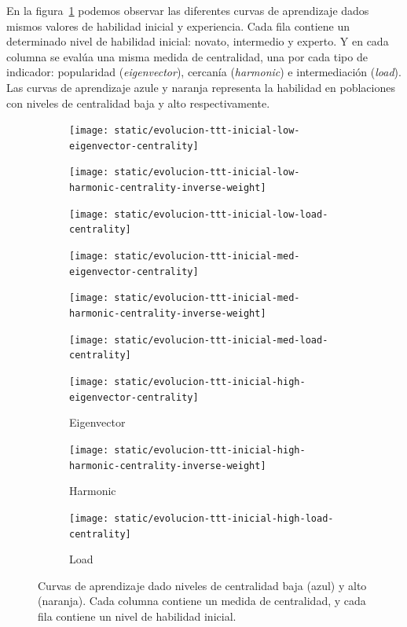 \documentclass[a4paper,11pt]{book}
\theoremstyle{definition}
\begin{document}
En la figura~\ref{fig:curvas_de_aprendizaje} podemos observar las diferentes curvas de aprendizaje dados mismos valores de habilidad inicial y experiencia.
%
Cada fila contiene un determinado nivel de habilidad inicial: novato, intermedio y experto.
%
Y en cada columna se eval\'ua una misma medida de centralidad, una por cada tipo de indicador: popularidad (\emph{eigenvector}), cercan\'ia (\emph{harmonic}) e intermediaci\'on (\emph{load}).
%
Las curvas de aprendizaje azule y naranja representa la habilidad en poblaciones con niveles de centralidad baja y alto respectivamente.
%
\begin{figure}[ht!]
    \centering
	\begin{subfigure}[t]{0.32\textwidth}\centering
	\texttt{[image: static/evolucion-ttt-inicial-low-eigenvector-centrality]}
	\end{subfigure}
	\begin{subfigure}[t]{0.32\textwidth}\centering
	\texttt{[image: static/evolucion-ttt-inicial-low-harmonic-centrality-inverse-weight]}
	\end{subfigure}
	\begin{subfigure}[t]{0.32\textwidth}\centering
	\texttt{[image: static/evolucion-ttt-inicial-low-load-centrality]}
	\end{subfigure}
	\begin{subfigure}[t]{0.32\textwidth}\centering
	\texttt{[image: static/evolucion-ttt-inicial-med-eigenvector-centrality]}
	\end{subfigure}
	\begin{subfigure}[t]{0.32\textwidth}\centering
	\texttt{[image: static/evolucion-ttt-inicial-med-harmonic-centrality-inverse-weight]}
	\end{subfigure}
	\begin{subfigure}[t]{0.32\textwidth}\centering
	\texttt{[image: static/evolucion-ttt-inicial-med-load-centrality]}
	\end{subfigure}
    \begin{subfigure}[t]{0.32\textwidth}\centering
	\texttt{[image: static/evolucion-ttt-inicial-high-eigenvector-centrality]}
	\caption{Eigenvector}
	\end{subfigure}
	\begin{subfigure}[t]{0.32\textwidth}\centering
	\texttt{[image: static/evolucion-ttt-inicial-high-harmonic-centrality-inverse-weight]}
	\caption{Harmonic}
	\end{subfigure}
	\begin{subfigure}[t]{0.32\textwidth}\centering
	\texttt{[image: static/evolucion-ttt-inicial-high-load-centrality]}
	\caption{Load}
	\end{subfigure}
	\caption{
	Curvas de aprendizaje dado niveles de centralidad baja (azul) y alto (naranja). Cada columna contiene un medida de centralidad, y cada fila contiene un nivel de habilidad inicial.
	}
	\label{fig:curvas_de_aprendizaje}
\end{figure}
\end{document}
